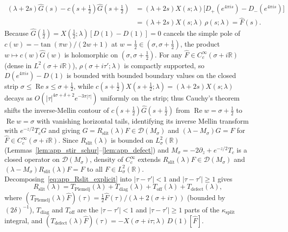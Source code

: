 \documentclass[11pt,a4paper]{article}
\begin{document}
\begin{align*}
(\lambda+2s)\widehat{G}(s) - c(s+\tfrac12)\widehat{G}(s+\tfrac12)
&= (\lambda+2s)X(s;\lambda)\bigl[D_+(e^{4\pi i s})-D_-(e^{4\pi i s})\bigr] \\
&= (\lambda+2s)X(s;\lambda)\,\rho(s;\lambda) = \widehat{F}(s).
\end{align*}
Because $\widehat{G}(\tfrac12)=X(\tfrac12;\lambda)[D(1)-D(1)]=0$ cancels the simple pole of $c(w)=-\tan(\pi w)/(2w+1)$
at $w=\tfrac12\in(\sigma,\sigma+\tfrac12)$, the product $w\mapsto c(w)\widehat{G}(w)$ is holomorphic on $(\sigma,\sigma+\tfrac12)$.
For any $\widehat{F}\in C_c^\infty(\sigma+i\mathbb{R})$ (dense in $L^2(\sigma+i\mathbb{R})$), $\rho(\sigma+i\tau';\lambda)$ is compactly
supported, so $D(e^{4\pi i s})-D(1)$ is bounded with bounded boundary values on the closed strip $\sigma\le\operatorname{Re}s\le\sigma+\tfrac12$,
while $c(s+\tfrac12)X(s+\tfrac12;\lambda)=(\lambda+2s)X(s;\lambda)$ decays as $O(|\tau|^{4\sigma+\delta+2}e^{-3\pi|\tau|})$ uniformly on the strip;
thus Cauchy's theorem shifts the inverse-Mellin contour of $c(s+\tfrac12)\widehat{G}(s+\tfrac12)$ from $\operatorname{Re}w=\sigma+\tfrac12$
to $\operatorname{Re}w=\sigma$ with vanishing horizontal tails, identifying its inverse Mellin transform with $e^{-z/2}T_c G$ and giving
$G=R_{\mathrm{slit}}(\lambda)F\in\mathcal{D}(M_\sigma)$ and $(\lambda-M_\sigma)G=F$ for $\widehat{F}\in C_c^\infty(\sigma+i\mathbb{R})$.
Since $R_{\mathrm{slit}}(\lambda)$ is bounded on $L^2_\sigma(\mathbb{R})$ (Lemmas~\ref{lem:app_stir_schur}--\ref{lem:app_defect}) and
$M_\sigma=-2\partial_z+e^{-z/2}T_c$ is a closed operator on $\mathcal{D}(M_\sigma)$, density of $C_c^\infty$ extends
$R_{\mathrm{slit}}(\lambda)F\in\mathcal{D}(M_\sigma)$ and $(\lambda-M_\sigma)R_{\mathrm{slit}}(\lambda)F=F$ to all $F\in L^2_\sigma(\mathbb{R})$.
Decomposing~\eqref{eq:app_Rslit_explicit} into $|\tau-\tau'|<1$ and $|\tau-\tau'|\ge 1$ gives
\[
R_{\mathrm{slit}}(\lambda) = T_{\mathrm{Plemelj}}(\lambda) + T_{\mathrm{diag}}(\lambda) + T_{\mathrm{off}}(\lambda) + T_{\mathrm{defect}}(\lambda),
\]
where $(T_{\mathrm{Plemelj}}(\lambda)\widehat{F})(\tau)=\frac{1}{2}\widehat{F}(\tau)/(\lambda+2(\sigma+i\tau))$
(bounded by $(2\delta)^{-1}$), $T_{\mathrm{diag}}$ and $T_{\mathrm{off}}$ are the $|\tau-\tau'|<1$ and
$|\tau-\tau'|\ge 1$ parts of the $\kappa_{\mathrm{split}}$ integral, and
$(T_{\mathrm{defect}}(\lambda)\widehat{F})(\tau) = -X(\sigma+i\tau;\lambda)\,D(1)[\widehat{F}]$.
\end{document}
